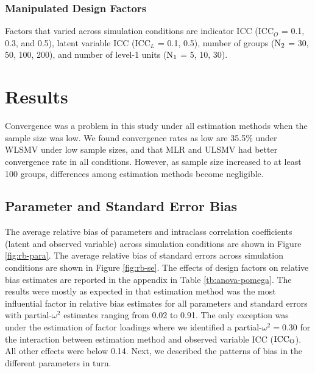 \documentclass[man, noextraspace, 12pt]{apa7}
\begin{document}
\subsubsection{Manipulated Design Factors}
Factors that varied across simulation conditions are indicator ICC ($\mathrm{ICC}_O$ = 0.1, 0.3, and 0.5), latent variable ICC ($\mathrm{ICC}_L$ = 0.1, 0.5), number of groups ($\rm N_2$ = 30, 50, 100, 200), and number of level-1 units ($\rm N_1$ = 5, 10, 30).

\section{Results}

Convergence was a problem in this study under all estimation methods when the sample size was low.
We found convergence rates as low are 35.5\% under WLSMV under low sample sizes, and that MLR and ULSMV had better convergence rate in all conditions.
However, as sample size increased to at least 100 groups, differences among estimation methods become negligible.

\subsection{Parameter and Standard Error Bias}

The average relative bias of parameters and intraclass correlation coefficients (latent and observed variable) across simulation conditions are shown in Figure \ref{fig:rb-para}.
The average relative bias of standard errors across simulation conditions are shown in Figure \ref{fig:rb-se}.
The effects of design factors on relative bias estimates are reported in the appendix in Table \ref{tb:anova-pomega}.
The results were mostly as expected in that estimation method was the most influential factor in relative bias estimates for all parameters and standard errors with partial-$\omega^2$ estimates ranging from 0.02 to 0.91. 
The only exception was under the estimation of factor loadings where we identified a  partial-$\omega^2 = 0.30$ for the interaction between estimation method and observed variable ICC ($\rm ICC_{O}$).
All other effects were below 0.14. 
Next, we described the patterns of bias in the different parameters in turn.
\end{document}
